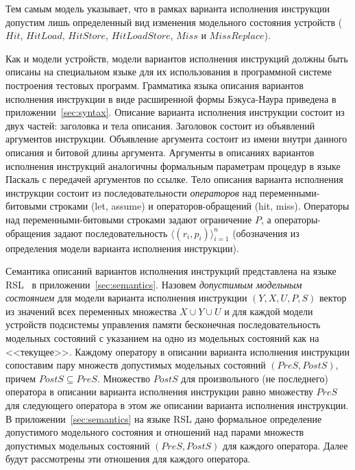 Тем самым модель указывает, что в рамках варианта исполнения инструкции допустим лишь определенный вид изменения модельного состояния устройств ($Hit$, $HitLoad$, $HitStore$, $HitLoadStore$, $Miss$ и $MissReplace$).

Как и модели устройств, модели вариантов исполнения инструкций должны быть описаны на специальном языке для их использования в программной системе построения тестовых программ. Грамматика языка описания вариантов исполнения инструкции в виде расширенной формы Бэкуса-Наура приведена в приложении~\ref{sec:syntax}. Описание варианта исполнения инструкции состоит из двух частей: заголовка и тела описания. Заголовок состоит из объявлений аргументов инструкции. Объявление аргумента состоит из имени внутри данного описания и битовой длины аргумента. Аргументы в описаниях вариантов исполнения инструкций аналогичны формальным параметрам процедур в языке Паскаль с передачей аргументов по ссылке. Тело описания варианта исполнения инструкции состоит из последовательности \emph{операторов} над переменными-битовыми строками (let, assume) и операторов-обращений (hit, miss). Операторы над переменными-битовыми строками задают ограничение $P$, а операторы-обращения задают последовательность $\langle (r_i, p_i) \rangle_{i=1}^n$ (обозначения из определения модели варианта исполнения инструкции).

Семантика описаний вариантов исполнения инструкций представлена на языке RSL~\cite{RSL} в приложении~\ref{sec:semantics}. Назовем \emph{допустимым модельным состоянием} для модели варианта исполнения инструкции $(Y, X, U, P, S)$ вектор из значений всех переменных множества $X \cup Y \cup U$ и для каждой модели устройств подсистемы управления памяти бесконечная последовательность модельных состояний с указанием на одно из модельных состояний как на <<текущее>>. Каждому оператору в описании варианта исполнения инструкции сопоставим пару множеств допустимых модельных состояний $(PreS, PostS)$, причем $PostS \subseteq PreS$. Множество $PostS$ для произвольного (не последнего) оператора в описании варианта исполнения инструкции равно множеству $PreS$ для следующего оператора в этом же описании варианта исполнения инструкции. В приложении~\ref{sec:semantics} на языке RSL дано формальное определение допустимого модельного состояния и отношений над парами множеств допустимых модельных состояний $(PreS, PostS)$ для каждого оператора. Далее будут рассмотрены эти отношения для каждого оператора.

